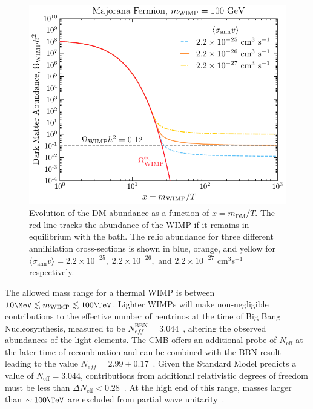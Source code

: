 \begin{figure}[t!]
    \centering
    \includegraphics{fig_dm_freezeout.pdf}
    \caption{Evolution of the DM abundance as a function of $x = m_\mathrm{DM}/T$. The red line tracks the abundance of the WIMP if it remains in equilibrium with the bath. The relic abundance for three different annihilation cross-sections is shown in blue, orange, and yellow for $\langle \sigma_\mathrm{ann} v\rangle = 2.2\times10^{-25},\;2.2\times10^{-26},$ and $2.2\times10^{-27}$ cm$^{3}$s$^{-1}$ respectively.}
    \label{ch1:fig:WIMP_freezeout}
\end{figure}

The allowed mass range for a thermal WIMP is between $10\MeV\lesssim m_\mathrm{WIMP} \lesssim 100\TeV$. Lighter WIMPs will make non-negligible contributions to the effective number of neutrinos at the time of Big Bang Nucleosynthesis, measured to be $N^\mathrm{BBN}_{eff} = 3.044$~\cite{Yeh:2022heq_oct_Probingphysicsstandard}, altering the observed abundances of the light elements. The CMB offers an additional probe of $N_\mathrm{eff}$ at the later time of recombination and can be combined with the BBN result leading to the value $N_{eff} = 2.99 \pm 0.17$~\cite{Planck:2018vyg_sep_Planck2018results}. Given the Standard Model predicts a value of $N_\mathrm{eff} = 3.044$, contributions from additional relativistic degrees of freedom must be less than $\Delta N_\mathrm{eff} < 0.28$~\cite{Yeh:2022heq_oct_Probingphysicsstandard}.  
At the high end of this range, masses larger than $\sim 100\TeV$ are excluded from partial wave unitarity~\cite{Griest:1989wd_UnitarityLimitsMass}. 
 

